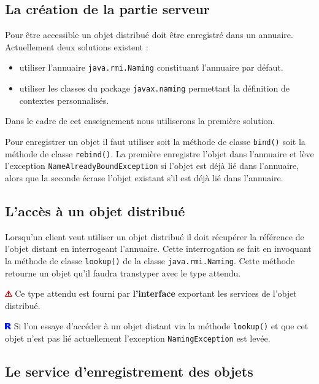 \documentclass[a4paper,11pt]{report}
\newcommand{\attention}[1]{
	\begin{center}
	\medskip
	\colorbox{attention}{
		\begin{minipage}{0.8\textwidth}\medskip\includegraphics[height=10px]{images/attention.png} #1 \medskip\end{minipage}
	}
	\medskip
	\end{center}
}
\newcommand{\remarque}[1]{
	\begin{center}
	\medskip
	\colorbox{remarque}{
		\begin{minipage}{0.8\textwidth}\medskip\includegraphics[height=10px]{images/remarque.png} #1 \medskip\end{minipage}
	}
	\medskip
	\end{center}
}
\begin{document}
\subsection{La création de la partie serveur}

Pour être accessible un objet distribué doit être enregistré dans un annuaire. Actuellement deux solutions existent :
\begin{itemize}
\item utiliser l\rq{}annuaire \texttt{java.rmi.Naming} constituant l\rq{}annuaire par défaut.
\item utiliser les classes du package \texttt{javax.naming} permettant la définition de contextes personnalisés.
\end{itemize}

Dans le cadre de cet enseignement nous utiliserons la première solution.

Pour enregistrer un objet il faut utiliser soit la méthode de classe \texttt{bind()} soit la méthode de classe \texttt{rebind()}. La première enregistre l\rq{}objet dans l\rq{}annuaire et lève l\rq{}exception \texttt{NameAlreadyBoundException} si l\rq{}objet est déjà lié dans l\rq{}annuaire, alors que la seconde écrase l\rq{}objet existant s\rq{}il est déjà lié dans l\rq{}annuaire.


\subsection{L\rq{}accès à un objet distribué}

Lorsqu\rq{}un client veut utiliser un objet distribué il doit récupérer la référence de l\rq{}objet distant en interrogeant l\rq{}annuaire. Cette interrogation se fait en invoquant la méthode de classe \texttt{lookup()} de la classe \texttt{java.rmi.Naming}. Cette méthode retourne un objet qu\rq{}il faudra transtyper avec le type attendu.

\attention{Ce type attendu est fourni par \textbf{l\rq{}interface} exportant les services de l\rq{}objet distribué.}
\remarque{Si l\rq{}on essaye d\rq{}accéder à un objet distant via la méthode \texttt{lookup()} et que cet objet n\rq{}est pas lié actuellement l\rq{}exception \texttt{NamingException} est levée.}


\subsection{Le service d\rq{}enregistrement des objets}
\end{document}
